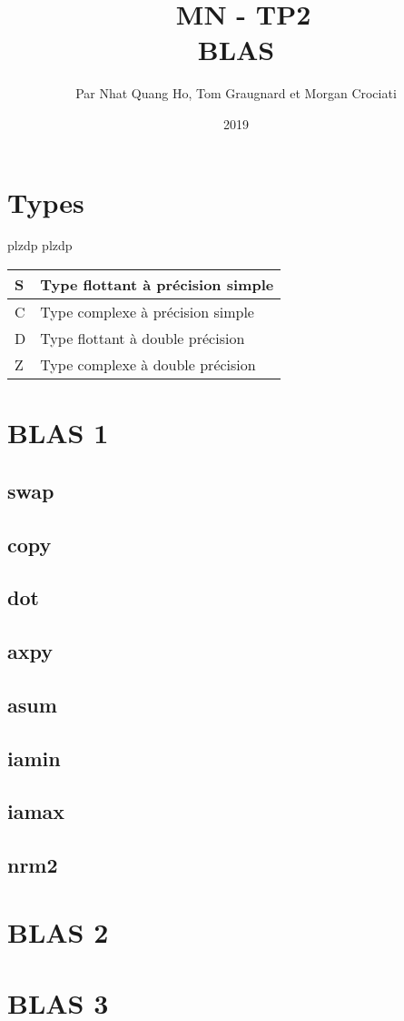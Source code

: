 \documentclass[french]{article}
\begin{document}
\title{\
MN - TP2\\
BLAS}

\author{Par Nhat Quang Ho, Tom Graugnard et Morgan Crociati}
\date{2019}
\maketitle

\newpage

\tableofcontents

\newpage

\section{Types}

plzdp plzdp 

\begin{table}[]
	\begin{tabular}{|l|l|}
	\hline
	S & Type flottant à précision simple \\ \hline
	C & Type complexe à précision simple \\ \hline
	D & Type flottant à double précision \\ \hline
	Z & Type complexe à double précision \\ \hline
	\end{tabular}
\end{table}

\section{BLAS 1}
\subsection{swap}
\subsection{copy}
\subsection{dot}
\subsection{axpy}
\subsection{asum}
\subsection{iamin}
\subsection{iamax}
\subsection{nrm2}

\section{BLAS 2}

\section{BLAS 3}
\end{document}
